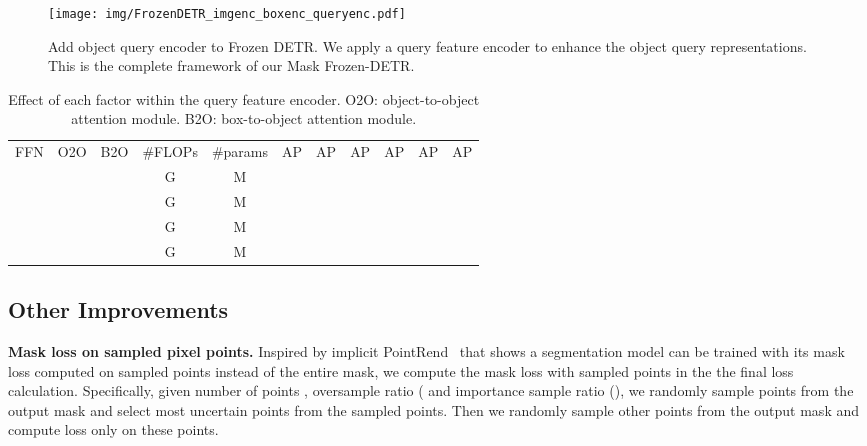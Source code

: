 \documentclass[10pt,twocolumn,letterpaper]{article}
\newcommand{\cmark}{\ding{51}}\newcommand{\xmark}{\ding{55}}
\begin{document}
\begin{figure}[t]
\centering
\texttt{[image: img/FrozenDETR\_imgenc\_boxenc\_queryenc.pdf]}
\caption{\small{Add object query encoder to Frozen DETR.} We apply a query feature encoder to enhance the object query representations. This is the complete framework of our Mask Frozen-DETR.}
\label{fig:frozen_detr_pipeline}
\end{figure}


\begin{table}[t]
\begin{minipage}[t]{1\linewidth}
\vspace{2mm}
\centering
\setlength{\tabcolsep}{1.5pt}
\footnotesize
\renewcommand{\arraystretch}{1.2}
\resizebox{1.0\linewidth}{!}
{
\begin{tabular}{c|c|c|c|c|cccccc}
FFN & O2O & B2O  & \#FLOPs & \#params & AP & AP & AP & AP & AP & AP \\
\shline
\xmark & \xmark & \xmark  &  G &  M &  &  &  &  &  &  \\
\cmark & \xmark & \xmark  &  G &  M &  &  &  &  &  &  \\
\cmark & \cmark & \xmark  &  G &  M &  &  &  &  &  &  \\
\rowcolor{gray!10}\cmark  & \xmark & \cmark  &  G &  M &  &  &  &  &  &  \\
\end{tabular}
}
\caption{\small{{
Effect of each factor within the query feature encoder.}
O2O: object-to-object attention module.
B2O: box-to-object attention module.
}
}
\label{tab:query_enc_ablate}
\end{minipage}
\end{table}


\subsection{Other Improvements}

\vspace{1mm}
\noindent\textbf{Mask loss on sampled pixel points.}
Inspired by implicit PointRend~\cite{cheng2022pointly} that shows a segmentation model can be trained with its mask loss computed on  sampled points instead of the entire mask, we compute the mask loss with sampled points in the  the final loss calculation. Specifically, 
given number of points , oversample ratio  ( and importance sample ratio  (), we randomly sample  points from the output mask and select  most uncertain points from the sampled points. Then we randomly sample other  points from the output mask and compute loss only on these  points.
\end{document}
